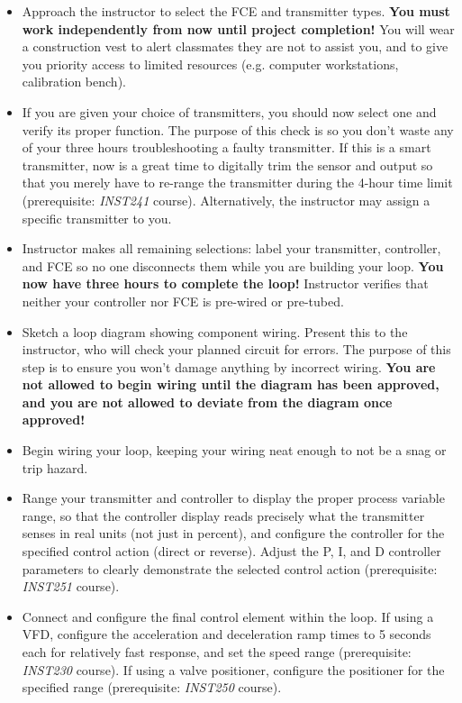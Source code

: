 \begin{itemize}
\item{} Approach the instructor to select the FCE and transmitter types.  {\bf You must work independently from now until project completion!}  You will wear a construction vest to alert classmates they are not to assist you, and to give you priority access to limited resources (e.g. computer workstations, calibration bench).
\vskip 10pt
\item{} If you are given your choice of transmitters, you should now select one and verify its proper function.  The purpose of this check is so you don't waste any of your three hours troubleshooting a faulty transmitter.  If this is a smart transmitter, now is a great time to digitally trim the sensor and output so that you merely have to re-range the transmitter during the 4-hour time limit (prerequisite: {\it INST241} course).  Alternatively, the instructor may assign a specific transmitter to you.
\vskip 10pt
\item{} Instructor makes all remaining selections: label your transmitter, controller, and FCE so no one disconnects them while you are building your loop.  {\bf You now have three hours to complete the loop!}  Instructor verifies that neither your controller nor FCE is pre-wired or pre-tubed.
\vskip 10pt
\item{} Sketch a loop diagram showing component wiring.  Present this to the instructor, who will check your planned circuit for errors.  The purpose of this step is to ensure you won't damage anything by incorrect wiring.  {\bf You are not allowed to begin wiring until the diagram has been approved, and you are not allowed to deviate from the diagram once approved!}
\vskip 10pt
\item{} Begin wiring your loop, keeping your wiring neat enough to not be a snag or trip hazard.
\vskip 10pt
\item{} Range your transmitter and controller to display the proper process variable range, so that the controller display reads precisely what the transmitter senses in real units (not just in percent), and configure the controller for the specified control action (direct or reverse).  Adjust the P, I, and D controller parameters to clearly demonstrate the selected control action (prerequisite: {\it INST251} course).
\vskip 10pt
\item{} Connect and configure the final control element within the loop.  If using a VFD, configure the acceleration and deceleration ramp times to 5 seconds each for relatively fast response, and set the speed range (prerequisite: {\it INST230} course).  If using a valve positioner, configure the positioner for the specified range (prerequisite: {\it INST250} course).

\end{itemize}
